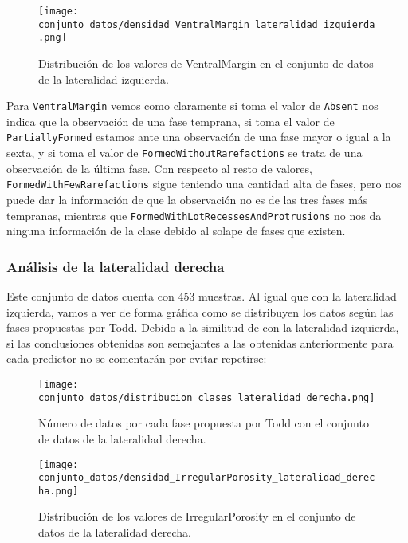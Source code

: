 \begin{figure}[H]
	\centering
	\texttt{[image: conjunto\_datos/densidad\_VentralMargin\_lateralidad\_izquierda.png]}
	\caption{Distribución de los valores de VentralMargin en el conjunto de datos de la lateralidad izquierda.}
	\label{fig:densidad_VentralMargin_izquierda}
\end{figure}

Para \texttt{VentralMargin} vemos como claramente si toma el valor de \texttt{Absent} nos indica que la observación de una fase temprana, si toma el valor de \texttt{PartiallyFormed} estamos ante una observación de una fase mayor o igual a la sexta, y si toma el valor de \texttt{FormedWithoutRarefactions} se trata de una observación de la última fase. Con respecto al resto de valores, \texttt{FormedWithFewRarefactions} sigue teniendo una cantidad alta de fases, pero nos puede dar la información de que la observación no es de las tres fases más tempranas, mientras que \texttt{FormedWithLotRecessesAndProtrusions} no nos da ninguna información de la clase debido al solape de fases que existen.

\newpage

\subsubsection{Análisis de la lateralidad derecha}

Este conjunto de datos cuenta con 453 muestras. Al igual que con la lateralidad izquierda, vamos a ver de forma gráfica como se distribuyen los datos según las fases propuestas por Todd. Debido a la similitud de con la lateralidad izquierda, si las conclusiones obtenidas son semejantes a las obtenidas anteriormente para cada predictor no se comentarán por evitar repetirse:

\begin{figure}[H]
	\centering
	\texttt{[image: conjunto\_datos/distribucion\_clases\_lateralidad\_derecha.png]}
	\caption{Número de datos por cada fase propuesta por Todd con el conjunto de datos de la lateralidad derecha.}
	\label{fig:conteo_l1}
\end{figure}


\begin{figure}[H]
	\centering
	\texttt{[image: conjunto\_datos/densidad\_IrregularPorosity\_lateralidad\_derecha.png]}
	\caption{Distribución de los valores de IrregularPorosity en el conjunto de datos de la lateralidad derecha.}
	\label{fig:densidad_IrregularPorosity_lateralidad_derecha}
\end{figure}

